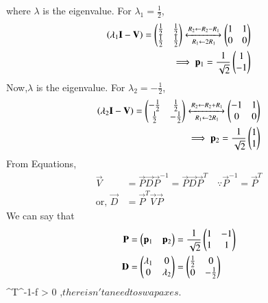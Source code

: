 \documentclass[journal,12pt,twocolumn]{IEEEtran}
\begin{document}
where $\lambda$ is the eigenvalue.  For $\lambda_1 = \frac{1}{2}$,
\begin{align}
\left(\lambda_1\mathbf{I}-\mathbf{V}\right)
= \begin{pmatrix}\frac{1}{2} & \frac{1}{2}
\\ \frac{1}{2} & \frac{1}{2}\end{pmatrix} 
\xleftrightarrow[R_1 \leftarrow 2R_1] {R_2\leftarrow R_2-R_1}\begin{pmatrix}1 & 1 \\0 & 0 \end{pmatrix}  
\\
\implies \mathbf{p}_1 = \frac{1}{\sqrt{2}}\begin{pmatrix}1 \\- 1\end{pmatrix}
\end{align}
Now,$\lambda$ is the eigenvalue.  For $\lambda_2 = -\frac{1}{2}$,
\begin{align}
\left(\lambda_2\mathbf{I}-\mathbf{V}\right)
= \begin{pmatrix}-\frac{1}{2} & \frac{1}{2}
\\ \frac{1}{2} & -\frac{1}{2}\end{pmatrix} 
\xleftrightarrow[R_1 \leftarrow 2R_1] {R_2\leftarrow R_2+R_1}\begin{pmatrix}-1 & 1 \\0 & 0 \end{pmatrix}  
\\
\implies \mathbf{p}_2 = \frac{1}{\sqrt{2}}\begin{pmatrix}1 \\ 1\end{pmatrix}
\end{align}
From Equations,
\begin{align}
\vec{V} &= \vec{P}\vec{D}\vec{P}^{-1}=\vec{P}\vec{D}\vec{P}^T \quad \because \vec{P}^{-1} = \vec{P}^{T}
\\
\text{or, } \vec{D} &= \vec{P}^T\vec{V}\vec{P}
\end{align}
We can say that
\begin{align}
\mathbf{P} & =\begin{pmatrix}\mathbf{p}_1 & \mathbf{p}_2\end{pmatrix} = \frac{1}{\sqrt{2}}\begin{pmatrix}1 & -1\\ 1 & 1\end{pmatrix}\\
 \mathbf{D} &= \begin{pmatrix}\lambda_1 & 0 \\ 0 & \lambda_2\end{pmatrix} =\begin{pmatrix}\frac{1}{2} & 0\\ 0 & -\frac{1}{2}\end{pmatrix}
\end{align}
\because {}^T^{-1}-f > 0 ,$there isn't a need to swap axes.$
\end{document}
